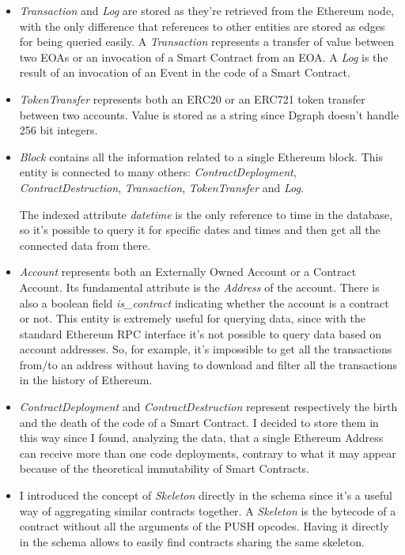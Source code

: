 \begin{itemize}

    \item \textit{Transaction} and \textit{Log} are stored as they're retrieved from the Ethereum node, with the only difference that references to other entities are stored as edges for being queried easily. A \textit{Transaction} represents a transfer of value between two EOAs or an invocation of a Smart Contract from an EOA. A \textit{Log} is the result of an invocation of an Event in the code of a Smart Contract.

    \item \textit{TokenTransfer} represents both an ERC20 or an ERC721 token transfer between two accounts. Value is stored as a string since Dgraph doesn't handle 256 bit integers.
    
    \item \textit{Block} contains all the information related to a single Ethereum block. This entity is connected to many others: \textit{ContractDeployment}, \textit{ContractDestruction}, \textit{Transaction}, \textit{TokenTransfer} and \textit{Log}. 
    
    The indexed attribute \textit{datetime} is the only reference to time in the database, so it's possible to query it for specific dates and times and then get all the connected data from there. 

    \item \textit{Account} represents both an Externally Owned Account or a Contract Account. Its fundamental attribute is the \textit{Address} of the account. There is also a boolean field \textit{is\_contract} indicating whether the account is a contract or not. This entity is extremely useful for querying data, since with the standard Ethereum RPC interface it's not possible to query data based on account addresses. So, for example, it's impossible to get all the transactions from/to an address without having to download and filter all the transactions in the history of Ethereum.

    \item \textit{ContractDeployment} and \textit{ContractDestruction} represent respectively the birth and the death of the code of a Smart Contract. I decided to store them in this way since I found, analyzing the data, that a single Ethereum Address can receive more than one code deployments, contrary to what it may appear because of the theoretical immutability of Smart Contracts. 

    \item I introduced the concept of \textit{Skeleton} directly in the schema since it's a useful way of aggregating similar contracts together. A \textit{Skeleton} is the bytecode of a contract without all the arguments of the PUSH opcodes. Having it directly in the schema allows to easily find contracts sharing the same skeleton.


\end{itemize}
